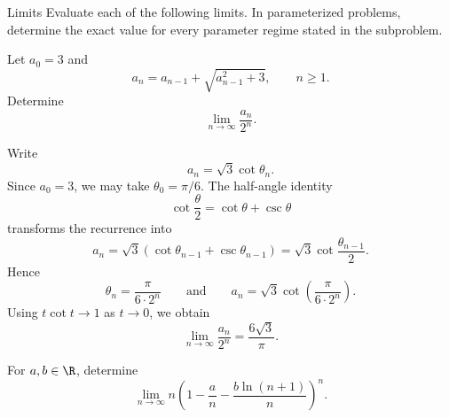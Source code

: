     \begin{expectedproblemgroup}{Limits}
        Evaluate each of the following limits. In parameterized problems,
        determine the exact value for every parameter regime stated in the
        subproblem.

        \begin{expectedsubproblem}
            Let $a_0=3$ and
            \[
                a_n=a_{n-1}+\sqrt{a_{n-1}^2+3},
                \qquad n\geq1.
            \]
            Determine
            \[
                \lim\limits_{n\to\infty}\frac{a_n}{2^n}.
            \]
        \end{expectedsubproblem}

        \begin{expectedsubsolution}
            Write
            \[
                a_n=\sqrt3\cot\theta_n.
            \]
            Since $a_0=3$, we may take $\theta_0=\pi/6$. The half-angle identity
            \[
                \cot\frac{\theta}{2}=\cot\theta+\csc\theta
            \]
            transforms the recurrence into
            \[
                a_n
                =
                \sqrt3\left(\cot\theta_{n-1}+\csc\theta_{n-1}\right)
                =
                \sqrt3\cot\frac{\theta_{n-1}}{2}.
            \]
            Hence
            \[
                \theta_n=\frac{\pi}{6\cdot2^n}
                \qquad\text{and}\qquad
                a_n=\sqrt3\cot\left(\frac{\pi}{6\cdot2^n}\right).
            \]
            Using $t\cot t\to1$ as $t\to0$, we obtain
            \[
                \boxed{
                    \lim\limits_{n\to\infty}\frac{a_n}{2^n}
                    =
                    \frac{6\sqrt3}{\pi}
                }.
            \]
        \end{expectedsubsolution}

        \begin{expectedsubproblem}
            For $a,b\in\R$, determine
            \[
                \lim\limits_{n\to\infty}
                n\left(
                    1-\frac{a}{n}-\frac{b\ln(n+1)}{n}
                \right)^n.
            \]
        \end{expectedsubproblem}


\end{expectedproblemgroup}
